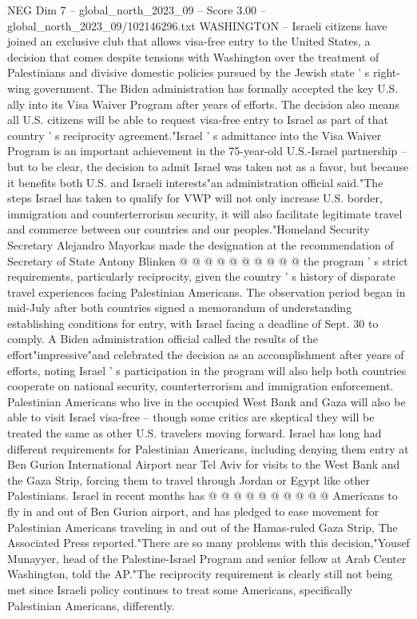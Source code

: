 \begin{textsample}{NEG Dim 7 – global\_north\_2023\_09 – Score 3.00 – global\_north\_2023\_09/102146296.txt}  \label{ex:f7_neg_089}
WASHINGTON -- Israeli citizens have joined an exclusive club that allows visa-free entry to the United States, a decision that comes despite tensions with Washington over the treatment of Palestinians and divisive domestic policies pursued by the Jewish state ' s right-wing government.
The Biden administration has formally accepted the key U.S. ally into its Visa Waiver Program after years of efforts.
The decision also means all U.S. citizens will be able to request visa-free entry to Israel as part of that country ' s reciprocity agreement."Israel ' s admittance into the Visa Waiver Program is an important achievement in the 75-year-old U.S.-Israel partnership -- but to be clear, the decision to admit Israel was taken not as a favor, but because it benefits both U.S. and Israeli interests"an administration official said."The steps Israel has taken to qualify for VWP will not only increase U.S. border, immigration and counterterrorism security, it will also facilitate legitimate travel and commerce between our countries and our peoples."Homeland Security Secretary Alejandro Mayorkas made the designation at the recommendation of Secretary of State Antony Blinken @ @ @ @ @ @ @ @ @ @ the program ' s strict requirements, particularly reciprocity, given the country ' s history of disparate travel experiences facing Palestinian Americans.
The observation period began in mid-July after both countries signed a memorandum of understanding establishing conditions for entry, with Israel facing a deadline of Sept. 30 to comply.
A Biden administration official called the results of the effort"impressive"and celebrated the decision as an accomplishment after years of efforts, noting Israel ' s participation in the program will also help both countries cooperate on national security, counterterrorism and immigration enforcement.
Palestinian Americans who live in the occupied West Bank and Gaza will also be able to visit Israel visa-free -- though some critics are skeptical they will be treated the same as other U.S. travelers moving forward.
Israel has long had different requirements for Palestinian Americans, including denying them entry at Ben Gurion International Airport near Tel Aviv for visits to the West Bank and the Gaza Strip, forcing them to travel through Jordan or Egypt like other Palestinians.
Israel in recent months has @ @ @ @ @ @ @ @ @ @ Americans to fly in and out of Ben Gurion airport, and has pledged to ease movement for Palestinian Americans traveling in and out of the Hamas-ruled Gaza Strip, The Associated Press reported."There are so many problems with this decision,"Yousef Munayyer, head of the Palestine-Israel Program and senior fellow at Arab Center Washington, told the AP."The reciprocity requirement is clearly still not being met since Israeli policy continues to treat some Americans, specifically Palestinian Americans, differently.

\end{textsample}
